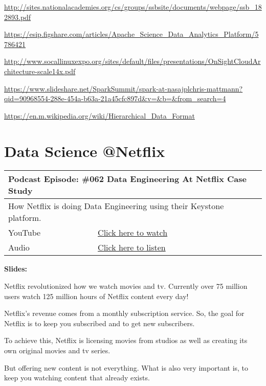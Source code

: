 \documentclass[12pt, numbers=noenddot]{scrreprt} %
\begin{document}
\url{http://sites.nationalacademies.org/cs/groups/ssbsite/documents/webpage/ssb_182893.pdf}

\url{https://esip.figshare.com/articles/Apache_Science_Data_Analytics_Platform/5786421}

\url{http://www.socallinuxexpo.org/sites/default/files/presentations/OnSightCloudArchitecture-scale14x.pdf}

\url{https://www.slideshare.net/SparkSummit/spark-at-nasajplchris-mattmann?qid=90968554-288e-454a-b63a-21a45cfc897d&v=&b=&from_search=4}

\url{https://en.m.wikipedia.org/wiki/Hierarchical_Data_Format}

\section{Data Science @Netflix}

\begin{table}[h]
\begin{tabular}{ll}
\hline
\multicolumn{2}{l}{\textbf{Podcast Episode:} \#062 Data Engineering At Netflix Case Study} \\ \hline
\multicolumn{2}{p{15cm}}{How Netflix is doing Data Engineering using their Keystone platform.}         \\ \hline
\multicolumn{1}{l|}{YouTube}   & \href{https://youtu.be/YWPsYpjNKeM}{Click here to watch}   \\ 
\multicolumn{1}{l|}{Audio}     & \href{https://anchor.fm/andreaskayy/episodes/062-Data-Engineering-At-Netflix-Case-Study-e45ikp}{Click here to listen}   \\ \hline
\end{tabular}
\end{table}

\textbf{Slides:}

Netflix revolutionized how we watch movies and tv. Currently over 75 million users watch 125 million hours of Netflix content every day!

Netflix’s revenue comes from a monthly subscription service. So, the goal for Netflix is to keep you subscribed and to get new subscribers.

To achieve this, Netflix is licensing movies from studios as well as creating its own original movies and tv series.

But offering new content is not everything. What is also very important is, to keep you watching content that already exists.
\end{document}
